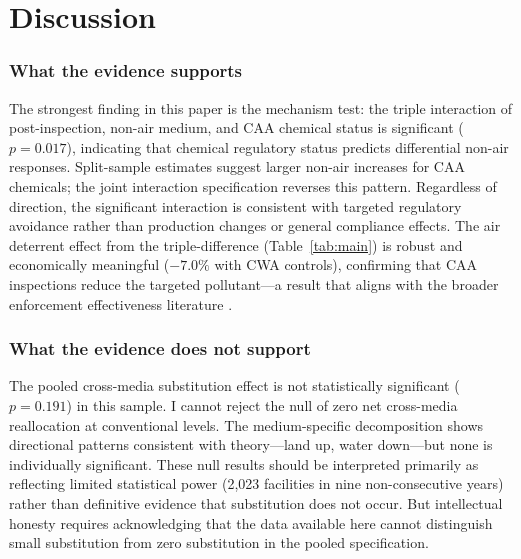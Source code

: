 \documentclass[12pt]{article}
\begin{document}
\section{Discussion}
\label{sec:discussion}

\subsubsection*{What the evidence supports} The strongest finding in this paper is the mechanism test: the triple interaction of post-inspection, non-air medium, and CAA chemical status is significant ($p = 0.017$), indicating that chemical regulatory status predicts differential non-air responses. Split-sample estimates suggest larger non-air increases for CAA chemicals; the joint interaction specification reverses this pattern. Regardless of direction, the significant interaction is consistent with targeted regulatory avoidance rather than production changes or general compliance effects. The air deterrent effect from the triple-difference (Table~\ref{tab:main}) is robust and economically meaningful ($-7.0\%$ with CWA controls), confirming that CAA inspections reduce the targeted pollutant---a result that aligns with the broader enforcement effectiveness literature \citep{gray2005compliance, shimshack2007enforce, gray2011effectiveness}.

\subsubsection*{What the evidence does not support} The pooled cross-media substitution effect is not statistically significant ($p = 0.191$) in this sample. I cannot reject the null of zero net cross-media reallocation at conventional levels. The medium-specific decomposition shows directional patterns consistent with theory---land up, water down---but none is individually significant. These null results should be interpreted primarily as reflecting limited statistical power (2,023 facilities in nine non-consecutive years) rather than definitive evidence that substitution does not occur. But intellectual honesty requires acknowledging that the data available here cannot distinguish small substitution from zero substitution in the pooled specification.
\end{document}
